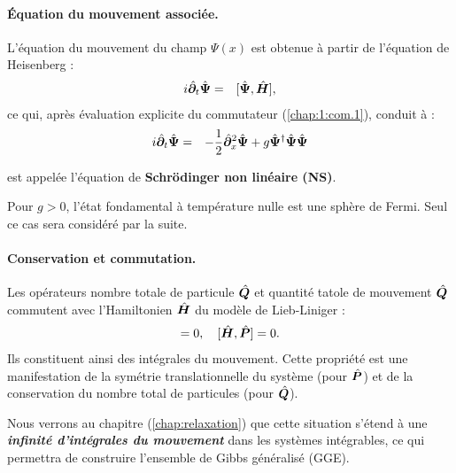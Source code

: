 \paragraph{Équation du mouvement associée.}

L’équation du mouvement du champ \( \Psi(x) \) est obtenue à partir de l’équation de Heisenberg :
\begin{eqnarray}
	i\hat{\bm{\partial}}_t	\hat{\bm{\Psi}} & = & [ \hat{\bm{\Psi}} , \hat{\bm{H}} ],
\end{eqnarray}
ce qui, après évaluation explicite du commutateur (\ref{chap:1:com.1}), conduit à :
\begin{eqnarray}
	i \hat{\bm{\partial}}_t \hat{\bm{\Psi}}	 & = & - \frac{1}{2}\hat{\bm{\partial}}_x^2 \hat{\bm{\Psi}} + g \hat{\bm{\Psi}}^\dag\hat{\bm{\Psi}} \hat{\bm{\Psi}}
\end{eqnarray}

est appelée l'équation de \textbf{Schrödinger non linéaire (NS)}.

Pour $g > 0$, l'état fondamental à température nulle est une sphère de Fermi. Seul ce cas sera considéré par la suite.


\paragraph{Conservation et commutation.}
Les opérateurs nombre totale de particule $\hat{\bm{Q}}$ et quantité tatole de mouvement  $\hat{\bm{Q}}$  commutent avec l’Hamiltonien $\hat{\bm{H}}$ du modèle de Lieb-Liniger :
\begin{eqnarray}
[ \operator{H} , \operator{Q} ] = 0, \quad [ \operator{H} , \operator{P} ] = 0.
\end{eqnarray}
Ils constituent ainsi des intégrales du mouvement. Cette propriété est une manifestation de la symétrie translationnelle du système (pour $\hat{\bm{P}}$) et de la conservation du nombre total de particules (pour $\hat{\bm{Q}}$).

\begin{mdframed}[
	linewidth=0.5pt, 
	backgroundcolor=gray!5, 
	roundcorner=50pt,	
	innerleftmargin=5pt,
    innerrightmargin=5pt,
    innertopmargin=5pt,
    innerbottommargin=2pt,
    leftmargin=2pt,
    rightmargin=2pt
	]
	Nous verrons au chapitre (\ref{chap:relaxation}) que cette situation s’étend à une {\bf \em infinité d’intégrales du mouvement} dans les systèmes intégrables, ce qui permettra de construire l’ensemble de Gibbs généralisé (GGE).
\end{mdframed}

